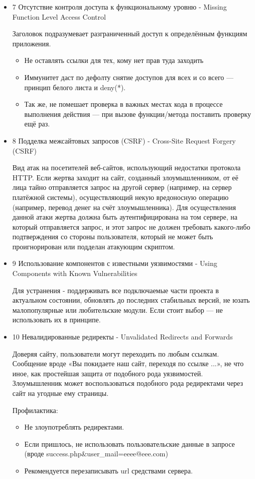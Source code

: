 \documentclass{article}
\begin{document}
\begin{itemize}
	\item 7 Отсутствие контроля доступа к функциональному уровню - Missing Function Level Access Control
	
	Заголовок подразумевает разграниченный доступ к определённым функциям приложения.
	\begin{itemize}
		\item Не оставлять ссылки для тех, кому нет прав туда заходить
		\item Иммунитет даст по дефолту снятие доступов для всех и со всего — принцип белого листа и deny(*).
		\item Так же, не помешает проверка в важных местах кода в процессе выполнения действия — при вызове функции/метода поставить проверку ещё раз.
	\end{itemize}
	
	\item 8 Подделка межсайтовых запросов (CSRF) - Cross-Site Request Forgery (CSRF)
	
	Вид атак на посетителей веб-сайтов, использующий недостатки протокола HTTP. Если жертва заходит на сайт, созданный злоумышленником, от её лица тайно отправляется запрос на другой сервер (например, на сервер платёжной системы), осуществляющий некую вредоносную операцию (например, перевод денег на счёт злоумышленника). Для осуществления данной атаки жертва должна быть аутентифицирована на том сервере, на который отправляется запрос, и этот запрос не должен требовать какого-либо подтверждения со стороны пользователя, который не может быть проигнорирован или подделан атакующим скриптом.
	
	\item 9 Использование компонентов с известными уязвимостями - Using Components with Known Vulnerabilities
	
	Для устранения - поддерживать все подключаемые части проекта в актуальном состоянии, обновлять до последних стабильных версий, не юзать малопопулярные или любительские модули. Если стоит выбор — не использовать их в принципе.
	
	\item 10 Невалидированные редиректы - Unvalidated Redirects and Forwards
	
	Доверяя сайту, пользователи могут переходить по любым ссылкам. Сообщение вроде «Вы покидаете наш сайт, переходя по ссылке ...», не что иное, как простейшая защита от подобного рода уязвимостей. Злоумышленник может воспользоваться подобного рода редиректами через сайт на угодные ему страницы.
	
	Профилактика:
	
	\begin{itemize}
		\item Не злоупотреблять редиректами.
		\item Если пришлось, не использовать пользовательские данные в запросе (вроде success.php\&user\_mail=eeee@eee.com)
		\item Рекомендуется перезаписывать url средствами сервера.
	\end{itemize}
	
	
\end{itemize}
\end{document}
